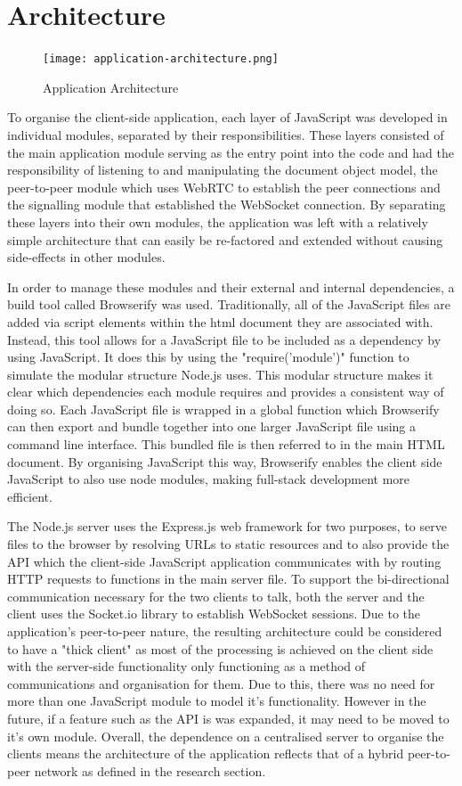 \documentclass[]{report}
\begin{document}
		\section{Architecture}
			\begin{figure}[H]
				\caption{Application Architecture}
				\centering
				\texttt{[image: application-architecture.png]}
			\end{figure}
			To organise the client-side application, each layer of JavaScript was developed in individual modules, separated by their responsibilities. These layers consisted of the main application module serving as the entry point into the code and had the responsibility of listening to and manipulating the document object model, the peer-to-peer module which uses WebRTC to establish the peer connections and the signalling module that established the WebSocket connection. By separating these layers into their own modules, the application was left with a relatively simple architecture that can easily be re-factored and extended without causing side-effects in other modules.
			
			In order to manage these modules and their external and internal dependencies, a build tool called Browserify was used. Traditionally, all of the JavaScript files are added via script elements within the html document they are associated with. Instead, this tool allows for a JavaScript file to be included as a dependency by using JavaScript. It does this by using the "require('module')" function to simulate the modular structure Node.js uses. This modular structure makes it clear which dependencies each module requires and provides a consistent way of doing so. Each JavaScript file is wrapped in a global function which Browserify can then export and bundle together into one larger JavaScript file using a command line interface. This bundled file is then referred to in the main HTML document. By organising JavaScript this way, Browserify enables the client side JavaScript to also use node modules, making full-stack development more efficient.
			
			The Node.js server uses the Express.js web framework for two purposes, to serve files to the browser by resolving URLs to static resources and to also provide the API which the client-side JavaScript application communicates with by routing HTTP requests to functions in the main server file. To support the bi-directional communication necessary for the two clients to talk, both the server and the client uses the Socket.io library to establish WebSocket sessions. Due to the application's peer-to-peer nature, the resulting architecture could be considered to have a "thick client" as most of the processing is achieved on the client side with the server-side functionality only functioning as a method of communications and organisation for them. Due to this, there was no need for more than one JavaScript module to model it's functionality. However in the future, if a feature such as the API is was expanded, it may need to be moved to it's own module. Overall, the dependence on a centralised server to organise the clients means the architecture of the application reflects that of a hybrid peer-to-peer network as defined in the research section.
						
\end{document}
